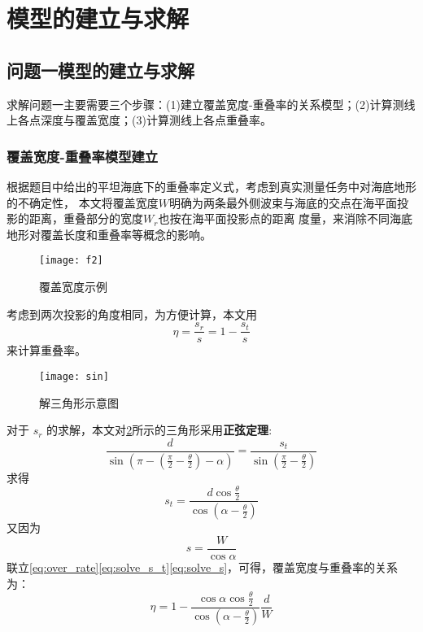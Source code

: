 \documentclass[withoutpreface,bwprint]{cumcmthesis} %
\begin{document}
        \section{模型的建立与求解}
        \subsection{问题一模型的建立与求解}
        求解问题一主要需要三个步骤：(1)建立覆盖宽度-重叠率的关系模型；(2)计算测线上各点深度与覆盖宽度；(3)计算测线上各点重叠率。
        \subsubsection{覆盖宽度-重叠率模型建立}
        
        根据题目中给出的平坦海底下的重叠率定义式，考虑到真实测量任务中对海底地形的不确定性，
        本文将覆盖宽度$W$明确为两条最外侧波束与海底的交点在海平面投影的距离，重叠部分的宽度$W_r$也按在海平面投影点的距离
        度量，来消除不同海底地形对覆盖长度和重叠率等概念的影响。
        \begin{figure}[H]
            \centering
            \texttt{[image: f2]}
            \caption{覆盖宽度示例}
            \label{fig:f2}
        \end{figure}
        考虑到两次投影的角度相同，为方便计算，本文用
        \begin{equation}
            \eta=\frac{s_r}{s} = 1-\frac{s_t}{s}
            \label{eq:over_rate}
        \end{equation}
        来计算重叠率。 
        \begin{figure}[H]
            \centering
            \texttt{[image: sin]}
            \caption{解三角形示意图}
            \label{fig:sin}
        \end{figure}
        对于 $s_r$ 的求解，本文对\cref{fig:sin}所示的三角形采用\textbf{正弦定理}:
        \begin{equation}
            \frac{d}{\sin(\pi - (\frac{\pi}{2}-\frac{\theta}{2})-\alpha)} = \frac{s_t}{\sin(\frac{\pi}{2} - \frac{\theta}{2})}
            \label{eq:sin}
        \end{equation}
        求得 
        \begin{equation}
            s_t = \frac{d\cos\frac{\theta}{2}}{\cos(\alpha-\frac{\theta}{2})}
            \label{eq:solve_s_t}
        \end{equation}
        又因为
        \begin{equation}
            s=\frac{W}{\cos\alpha}
            \label{eq:solve_s}
        \end{equation}
        联立\cref{eq:over_rate}\cref{eq:solve_s_t}\cref{eq:solve_s}，可得，覆盖宽度与重叠率的关系为：
        \begin{equation}
            \eta = 1 - \frac{\cos\alpha\cos\frac{\theta}{2}}{\cos(\alpha - \frac{\theta}{2})}\frac{d}{W}
            \label{eq:eta_W}
        \end{equation}
       
\end{document}
